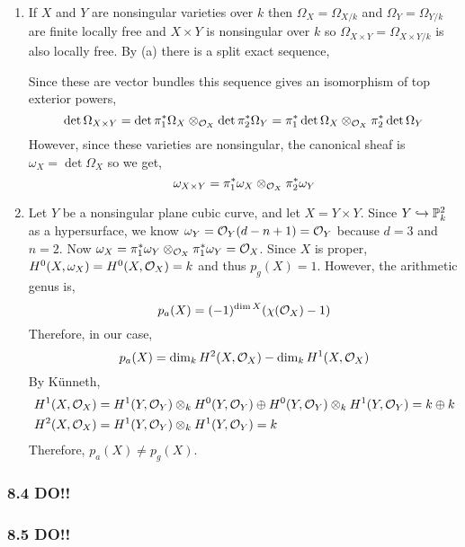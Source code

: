 \documentclass[12pt]{article}
\begin{document}
\begin{enumerate}
\item If $X$ and $Y$ are nonsingular varieties over $k$ then $\Omega_{X} = \Omega_{X/k}$ and $\Omega_{Y} = \Omega_{Y/k}$ are finite locally free and $X \times Y$ is nonsingular over $k$ so $\Omega_{X \times Y} = \Omega_{X \times Y / k}$ is also locally free. By (a) there is a split exact sequence,
\begin{center}
\end{center}
Since these are vector bundles this sequence gives an isomorphism of top exterior powers,
\[ \det{\Omega_{X \times Y}} = \det{\pi_1^* \Omega_X} \otimes_{\mathcal{O}_{X}} \det{\pi_2^* \Omega_Y} = \pi_1^* \det{\Omega_X} \otimes_{\mathcal{O}_{X}} \pi_2^* \det{\Omega_Y} \]
However, since these varieties are nonsingular, the canonical sheaf is $\omega_X = \det{\Omega_X}$ so we get,
\[ \omega_{X \times Y} = \pi_1^* \omega_X \otimes_{\mathcal{O}_{X}} \pi_2^* \omega_Y \]

\item Let $Y$ be a nonsingular plane cubic curve, and let $X = Y \times Y$. Since $Y \hookrightarrow \mathbb{P}^2_k$ as a hypersurface, we know $\omega_Y = \mathcal{O}_{Y}(d - n + 1) = \mathcal{O}_{Y}$ because $d = 3$ and $n = 2$.  Now $\omega_X = \pi_1^* \omega_Y \otimes_{\mathcal{O}_{X}} \pi_1^* \omega_Y = \mathcal{O}_{X}$. Since $X$ is proper, $H^0(X, \omega_X) = H^0(X, \mathcal{O}_{X}) = k$ and thus $p_g(X) = 1$. However, the arithmetic genus is,
\[ p_a(X) = (-1)^{\dim{X}} (\chi(\mathcal{O}_{X}) - 1) \]
Therefore, in our case,
\[ p_a(X) = \dim_k H^2(X, \mathcal{O}_{X}) - \dim_k H^1(X, \mathcal{O}_{X}) \]
By K\"{u}nneth,
\begin{align*}
H^1(X, \mathcal{O}_{X}) & = H^1(Y, \mathcal{O}_{Y}) \otimes_k H^0(Y, \mathcal{O}_{Y}) \oplus H^0(Y, \mathcal{O}_{Y}) \otimes_k H^1(Y, \mathcal{O}_{Y}) = k \oplus k 
\\
H^2(X, \mathcal{O}_{X}) & = H^1(Y, \mathcal{O}_{Y}) \otimes_k H^1(Y, \mathcal{O}_{Y}) = k 
\end{align*}
Therefore, $p_a(X) \neq p_g(X)$.
\end{enumerate}

\subsubsection{8.4 DO!!}

\subsubsection{8.5 DO!!}
\end{document}
